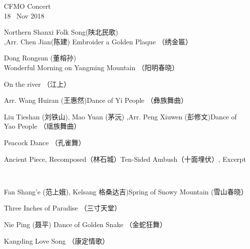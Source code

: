 \documentclass[letter,6pt,poets]{ConcProg}
\begin{document}
\begin{programme}{
    CFMO Concert
\\  {\normalsize 18 ~Nov 2018}
}
\begin{part}[]
    \begin{composition}{Northern Shanxi Folk Song(陕北民歌)\\,Arr. Chen Jian(陈建)} {}{Embroider a Golden Plaque  （绣金匾）}{}
    \end{composition}
    \begin{composition}{Dong Rongsun (董榕孙)} {}{Wonderful Morning on Yangming Mountain  （阳明春晓）
}{}
    \end{composition}
    \begin{composition}{} {}{On the river （江上）}{}
    \end{composition}
    \begin{composition}{Arr. Wang Huiran (王惠然)}{}{Dance of Yi People  （彝族舞曲）}{}
    \end{composition}
    \begin{composition}{Liu Tieshan (刘铁山), Mao Yuan (茅沅) ,Arr. Peng Xiuwen (彭修文)}{}{Dance of Yao People  （瑶族舞曲）}{}
    \end{composition}
    \begin{composition}{}{}{Peacock Dance  （孔雀舞） }{}
    \end{composition}
    \begin{composition}{Ancient Piece, Recomposed（林石城）}{}{Ten-Sided Ambush（十面埋伏）, Excerpt}{}
    \end{composition}\\
    \begin{composition}{Fan Shang'e (范上娥), Kelsang 格桑达吉)}{}{Spring of Snowy Mountain   (雪山春晓）}{}
                   {}{}
    \end{composition}
    \begin{composition}{}{}{Three Inches of Paradise  （三寸天堂）}{}
    \end{composition}
    \begin{composition}{Nie Ping (聂平)} {}{Dance of Golden Snake  （金蛇狂舞）}{}
    \end{composition}
    \begin{composition}{}{}{Kangding Love Song  （康定情歌）}{}

\end{composition}
\end{part}
\end{programme}
\end{document}
